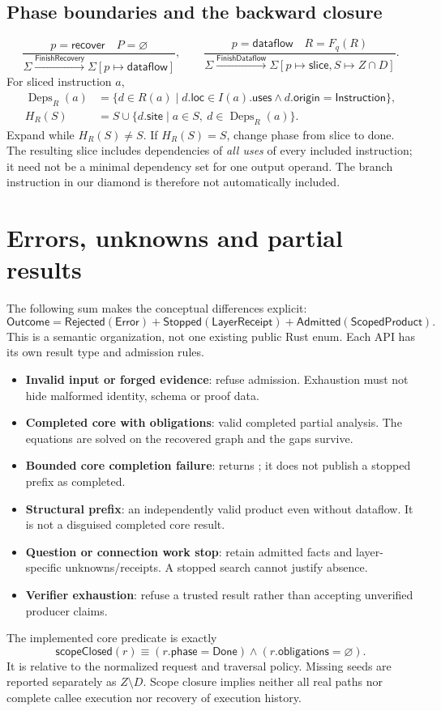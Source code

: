 \documentclass[11pt,a4paper]{article}
\newcommand{\ty}[1]{\mathsf{#1}}
\newcommand{\deps}{\operatorname{Deps}}
\newcommand{\code}[1]{\texttt{\detokenize{#1}}}
\begin{document}
\subsection{Phase boundaries and the backward closure}
\[
\frac{p=\ty{recover}\quad P=\varnothing}
 {\Sigma\xrightarrow{\ty{FinishRecovery}}\Sigma[p\mapsto\ty{dataflow}]},
\qquad
\frac{p=\ty{dataflow}\quad R=F_q(R)}
 {\Sigma\xrightarrow{\ty{FinishDataflow}}
  \Sigma[p\mapsto\ty{slice},S\mapsto Z\cap D]}.
\]
For sliced instruction $a$,
\begin{align*}
 \deps_R(a)&=\{d\in R(a)\mid d.\ty{loc}\in I(a).\ty{uses}
                     \land d.\ty{origin}=\ty{Instruction}\},\\
 H_R(S)&=S\cup\{d.\ty{site}\mid a\in S,\ d\in\deps_R(a)\}.
\end{align*}
Expand while $H_R(S)\ne S$. If $H_R(S)=S$, change phase from slice to done.
The resulting slice includes dependencies of \emph{all uses} of every included
instruction; it need not be a minimal dependency set for one output operand.
The branch instruction in our diamond is therefore not automatically included.

\section{Errors, unknowns and partial results}
\label{sec:errors}
The following sum makes the conceptual differences explicit:
\[
 \ty{Outcome}=\ty{Rejected}(\ty{Error})
 +\ty{Stopped}(\ty{LayerReceipt})
 +\ty{Admitted}(\ty{ScopedProduct}).
\]
This is a semantic organization, not one existing public Rust enum. Each API
has its own result type and admission rules.

\begin{itemize}
\item \textbf{Invalid input or forged evidence}: refuse admission. Exhaustion
must not hide malformed identity, schema or proof data.
\item \textbf{Completed core with obligations}: valid completed partial
analysis. The equations are solved on the recovered graph and the gaps survive.
\item \textbf{Bounded core completion failure}: \code{finish_bounded} returns
\code{CompletionError}; it does not publish a stopped prefix as completed.
\item \textbf{Structural prefix}: an independently valid product even without
dataflow. It is not a disguised completed core result.
\item \textbf{Question or connection work stop}: retain admitted facts and
layer-specific unknowns/receipts. A stopped search cannot justify absence.
\item \textbf{Verifier exhaustion}: refuse a trusted result rather than
accepting unverified producer claims.
\end{itemize}
The implemented core predicate is exactly
\[
 \ty{scopeClosed}(r)\equiv
 (r.\ty{phase}=\ty{Done})\land(r.\ty{obligations}=\varnothing).
\]
It is relative to the normalized request and traversal policy. Missing seeds
are reported separately as $Z\setminus D$. Scope closure implies neither all
real paths nor complete callee execution nor recovery of execution history.
\end{document}

